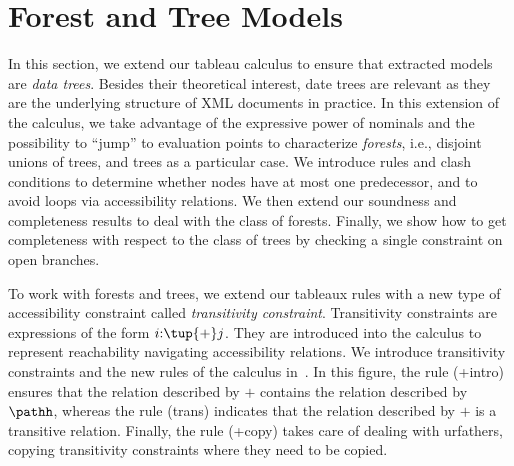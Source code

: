 \section{Forest and Tree Models}
\label{sec:extensionplus}


In this section, we extend our tableau calculus to ensure that extracted models are \emph{data trees}.
Besides their theoretical interest, date trees are relevant as they are the underlying structure of XML documents in practice.
In this extension of the calculus, we take advantage of the expressive power of nominals and the possibility to ``jump'' to evaluation points to characterize \emph{forests}, i.e., disjoint unions of trees, and trees as a particular case.
We introduce rules and clash conditions to determine whether nodes have at most one predecessor, and to avoid loops via accessibility relations.  
We then extend our soundness and completeness results to deal with the
class of forests.
Finally, we show how to  get completeness with respect to the class of trees by
checking a single constraint on open branches.

To work with forests and trees, we extend our tableaux rules with a new type of accessibility constraint called {\em transitivity constraint}.
Transitivity constraints are expressions of the form $i{:}\tup{+} j$.
They are introduced into the calculus to represent reachability navigating accessibility relations.
We introduce transitivity constraints and the new rules of the calculus in~.  
In this figure, the rule (+intro) ensures that the relation described by ${+}$ contains the relation described by ${\pathh}$, whereas the rule (trans) indicates that the relation described by ${+}$ is a transitive relation.
Finally, the rule (+copy) takes care of dealing with urfathers, copying transitivity constraints where they need to be copied.
 
